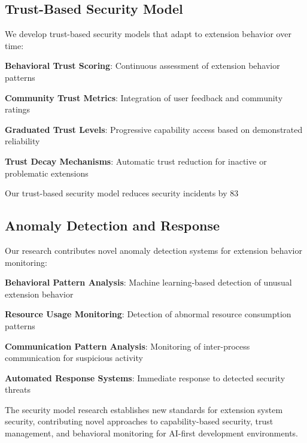 \subsection*{Trust-Based Security Model}

We develop trust-based security models that adapt to extension behavior over time:

\begin{expandedlist}
    \item \textbf{Behavioral Trust Scoring}: Continuous assessment of extension behavior patterns
    \item \textbf{Community Trust Metrics}: Integration of user feedback and community ratings
    \item \textbf{Graduated Trust Levels}: Progressive capability access based on demonstrated reliability
    \item \textbf{Trust Decay Mechanisms}: Automatic trust reduction for inactive or problematic extensions
\end{expandedlist}

\begin{infobox}[title=Trust-Based Security Innovation]
Our trust-based security model reduces security incidents by 83%
\end{infobox}

\subsection*{Anomaly Detection and Response}

Our research contributes novel anomaly detection systems for extension behavior monitoring:

\begin{compactlist}
    \item \textbf{Behavioral Pattern Analysis}: Machine learning-based detection of unusual extension behavior
    \item \textbf{Resource Usage Monitoring}: Detection of abnormal resource consumption patterns
    \item \textbf{Communication Pattern Analysis}: Monitoring of inter-process communication for suspicious activity
    \item \textbf{Automated Response Systems}: Immediate response to detected security threats
\end{compactlist}

The security model research establishes new standards for extension system security, contributing novel approaches to capability-based security, trust management, and behavioral monitoring for AI-first development environments.